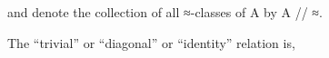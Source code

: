 \documentclass[sigplan,screen]{acmart}
\begin{document}
\begin{code}
\\[\AgdaEmptyExtraSkip]%
\>[0]\AgdaOperator{\AgdaFunction{[\AgdaUnderscore{}]\AgdaUnderscore{}}}\AgdaSpace{}%
\AgdaSymbol{:}%
\>[8]\AgdaSymbol{\{}\AgdaSpace{}%
\AgdaSymbol{:}\AgdaSpace{}%
\AgdaSpace{}%
\AgdaSpace{}%
\AgdaSymbol{\}}\AgdaSpace{}%
%
\>[22]\AgdaSymbol{(}\AgdaSpace{}%
\AgdaSymbol{:}\AgdaSpace{}%
\AgdaSymbol{)}\AgdaSpace{}%
\AgdaSpace{}%
\AgdaSpace{}%
\AgdaSpace{}%
\AgdaSpace{}%
\AgdaSpace{}%
\AgdaSpace{}%
\AgdaSpace{}%
\AgdaSpace{}%
\<%
\\
\>[0]\AgdaOperator{\AgdaFunction{[}}\AgdaSpace{}%
\AgdaSpace{}%
\AgdaOperator{\AgdaFunction{]}}\AgdaSpace{}%
\AgdaSpace{}%
\AgdaSymbol{=}\AgdaSpace{}%
\AgdaSpace{}%
\AgdaSpace{}%
\AgdaSpace{}%
\AgdaSymbol{\AgdaUnderscore{}}\AgdaSpace{}%
\AgdaFunction{,}%
\>[21]\AgdaSpace{}%
\AgdaSpace{}%
\<%
\end{code}
and denote the collection of all ≈-classes of A by A // ≈.

\begin{code}\end{code}

The ``trivial'' or ``diagonal'' or ``identity'' relation is,
\end{document}
